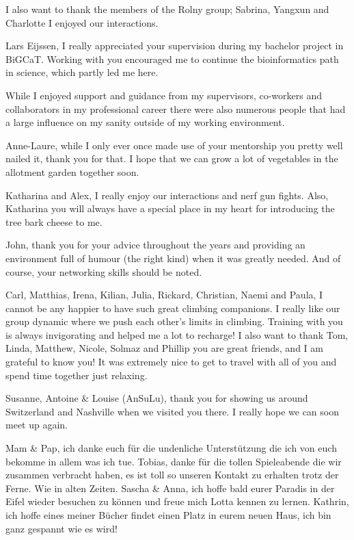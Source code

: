 \documentclass[12pt,openany]{book}
\begin{document}
I also want to thank the members of the Rolny group; Sabrina, Yangxun
and Charlotte I enjoyed our interactions.

Lars Eijssen, I really appreciated your supervision during my bachelor
project in BiGCaT. Working with you encouraged me to continue the
bioinformatics path in science, which partly led me here.

While I enjoyed support and guidance from my supervisors, co-workers and
collaborators in my professional career there were also numerous people
that had a large influence on my sanity outside of my working
environment.

Anne-Laure, while I only ever once made use of your mentorship you
pretty well nailed it, thank you for that. I hope that we can grow a lot
of vegetables in the allotment garden together soon.

Katharina and Alex, I really enjoy our interactions and nerf gun fights.
Also, Katharina you will always have a special place in my heart for
introducing the tree bark cheese to me.

John, thank you for your advice throughout the years and providing an
environment full of humour (the right kind) when it was greatly needed.
And of course, your networking skills should be noted.

Carl, Matthias, Irena, Kilian, Julia, Rickard, Christian, Naemi and
Paula, I cannot be any happier to have such great climbing companions. I
really like our group dynamic where we push each other's limits in
climbing. Training with you is always invigorating and helped me a lot
to recharge! I also want to thank Tom, Linda, Matthew, Nicole, Solmaz
and Phillip you are great friends, and I am grateful to know you! It was
extremely nice to get to travel with all of you and spend time together
just relaxing.

Susanne, Antoine \& Louise (AnSuLu), thank you for showing us around
Switzerland and Nashville when we visited you there. I really hope we
can soon meet up again.

Mam \& Pap, ich danke euch für die undenliche Unterstützung die ich von
euch bekomme in allem was ich tue. Tobias, danke für die tollen
Spieleabende die wir zusammen verbracht haben, es ist toll so unseren
Kontakt zu erhalten trotz der Ferne. Wie in alten Zeiten. Sascha \&
Anna, ich hoffe bald eurer Paradis in der Eifel wieder besuchen zu
können und freue mich Lotta kennen zu lernen. Kathrin, ich hoffe eines
meiner Bücher findet einen Platz in eurem neuen Haus, ich bin ganz
gespannt wie es wird!
\end{document}
